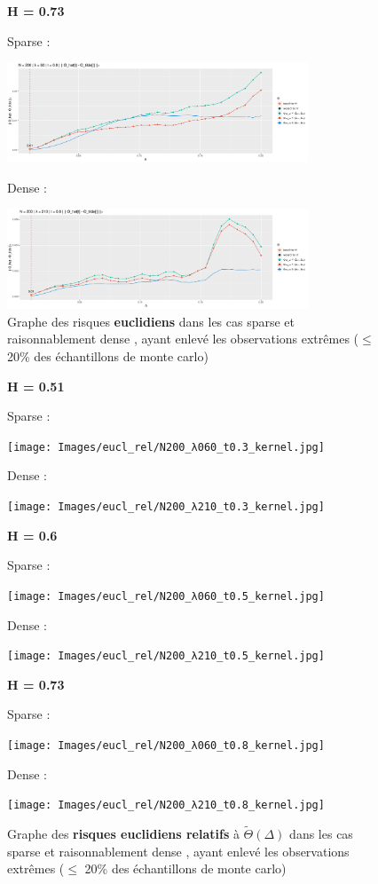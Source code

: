 \begin{figure}[H]
	\centering
	\textbf{ H = 0.73 }

	Sparse :

	\includegraphics[width=0.8\textwidth]{Images/risque/N200_t0.8_lbd60.jpg}

	Dense :

	\includegraphics[width=0.8\textwidth]{Images/risque/N200_t0.8_lbd210.jpg}

	\label{fig:sparse_osef}
	\caption{Graphe des risques \textbf{euclidiens} dans les cas \og sparse \fg et \og raisonnablement dense \fg, ayant enlevé les observations extrêmes ($\leq$ 20\% des échantillons de monte carlo)}
\end{figure}



\begin{figure}[H]
	\centering
	\textbf{ H = 0.51 }

	Sparse :

\texttt{[image: Images/eucl\_rel/N200\_λ060\_t0.3\_kernel.jpg]}

	Dense :

\texttt{[image: Images/eucl\_rel/N200\_λ210\_t0.3\_kernel.jpg]}
\end{figure}

\begin{figure}[H]
	\centering
	\textbf{ H = 0.6 }

	Sparse :

\texttt{[image: Images/eucl\_rel/N200\_λ060\_t0.5\_kernel.jpg]}

	Dense :

\texttt{[image: Images/eucl\_rel/N200\_λ210\_t0.5\_kernel.jpg]}
\end{figure}

\begin{figure}[H]
	\centering
	\textbf{ H = 0.73 }

	Sparse :

\texttt{[image: Images/eucl\_rel/N200\_λ060\_t0.8\_kernel.jpg]}

	Dense :

\texttt{[image: Images/eucl\_rel/N200\_λ210\_t0.8\_kernel.jpg]}

	\label{fig:sparse_osef_rel}
\caption{Graphe des \textbf{risques euclidiens relatifs} à $\widetilde \Theta(\Delta)$ dans les cas \og sparse \fg et \og raisonnablement dense \fg, ayant enlevé les observations extrêmes ($\leq$ 20\% des échantillons de monte carlo)}
\end{figure}
